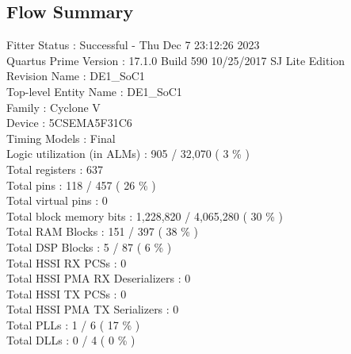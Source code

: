 \documentclass[11pt, titlepage]{article}
\begin{document}
        \newpage
        \subsection{Flow Summary}
            Fitter Status : Successful - Thu Dec  7 23:12:26 2023 \\
            Quartus Prime Version : 17.1.0 Build 590 10/25/2017 SJ Lite Edition \\
            Revision Name : DE1\_SoC1 \\
            Top-level Entity Name : DE1\_SoC1 \\
            Family : Cyclone V \\
            Device : 5CSEMA5F31C6 \\
            Timing Models : Final \\
            Logic utilization (in ALMs) : 905 / 32,070 ( 3 \% ) \\
            Total registers : 637 \\
            Total pins : 118 / 457 ( 26 \% ) \\
            Total virtual pins : 0 \\
            Total block memory bits : 1,228,820 / 4,065,280 ( 30 \% ) \\
            Total RAM Blocks : 151 / 397 ( 38 \% ) \\
            Total DSP Blocks : 5 / 87 ( 6 \% ) \\
            Total HSSI RX PCSs : 0 \\
            Total HSSI PMA RX Deserializers : 0 \\
            Total HSSI TX PCSs : 0 \\
            Total HSSI PMA TX Serializers : 0 \\
            Total PLLs : 1 / 6 ( 17 \% ) \\
            Total DLLs : 0 / 4 ( 0 \% ) \\
\end{document}
